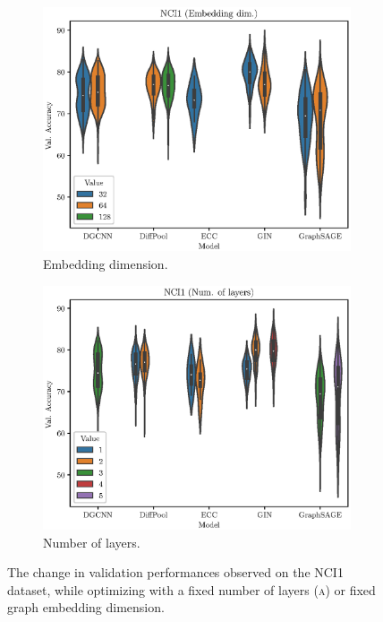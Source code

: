 \begin{figure}[h!]
    \centering
    \begin{subfigure}[b]{0.49\textwidth}
        \centering
        \includegraphics[width=\textwidth]{Figures/Chapter4/nci1-embedding.eps}
        \caption{Embedding dimension.}
        \label{fig:nci1-layer}
    \end{subfigure}
    \hfill
    \begin{subfigure}[b]{0.49\textwidth}
        \centering
        \includegraphics[width=\textwidth]{Figures/Chapter4/nci1-layers.eps}
        \caption{Number of layers.}
        \label{fig:nci1-emb}
    \end{subfigure}
       \caption{The change in validation performances observed on the NCI1 dataset, while optimizing with a fixed number of layers \textsc{(a)} or fixed graph embedding dimension.}
       \label{fig:nci1-posthoc}
\end{figure}


